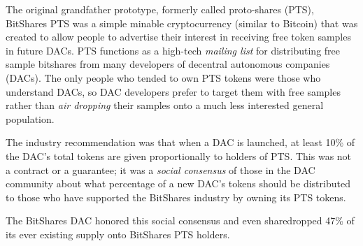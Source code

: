 The original grandfather prototype, formerly called proto-shares (PTS),
BitShares PTS was a simple minable cryptocurrency (similar to Bitcoin) that
was created to allow people to advertise their interest in receiving free token
samples in future DACs. PTS functions as a high-tech \emph{mailing list} for
distributing free sample bitshares from many developers of decentral autonomous
companies (DACs). The only people who tended to own PTS tokens were those who
understand DACs, so DAC developers prefer to target them with free samples
rather than \emph{air dropping} their samples onto a much less interested
general population.

The industry recommendation was that when a DAC is launched, at least 10\% of
the DAC's total tokens are given proportionally to holders of PTS. This was not
a contract or a guarantee; it was a \emph{social consensus} of those in the DAC
community about what percentage of a new DAC's tokens should be distributed to
those who have supported the BitShares industry by owning its PTS tokens.

The BitShares DAC honored this social consensus and even sharedropped 47\% of
its ever existing supply onto BitShares PTS holders.
